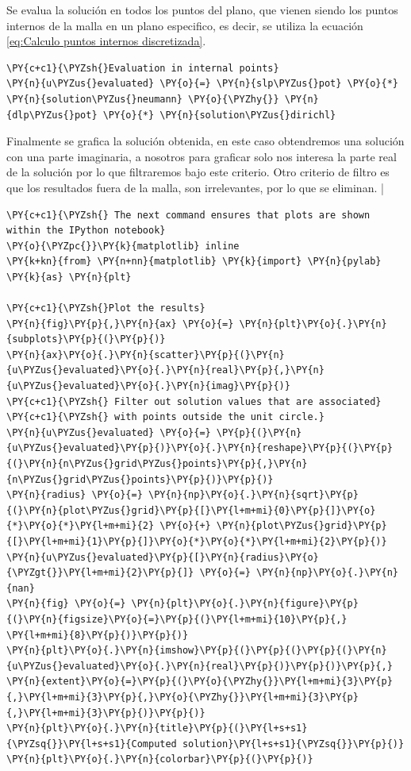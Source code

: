Se evalua la solución en todos los puntos del plano, que vienen siendo los puntos internos de la malla en un plano especifico, es decir, se utiliza la ecuación \eqref{eq:Calculo puntos internos discretizada}.
\begin{tcolorbox}
\begin{Verbatim}[commandchars=\\\{\}]
\PY{c+c1}{\PYZsh{}Evaluation in internal points} 
\PY{n}{u\PYZus{}evaluated} \PY{o}{=} \PY{n}{slp\PYZus{}pot} \PY{o}{*} \PY{n}{solution\PYZus{}neumann} \PY{o}{\PYZhy{}} \PY{n}{dlp\PYZus{}pot} \PY{o}{*} \PY{n}{solution\PYZus{}dirichl}
\end{Verbatim}
\end{tcolorbox}
Finalmente se grafica la solución obtenida, en este caso obtendremos una solución con una parte imaginaria, a nosotros para graficar solo nos interesa la parte real de la solución por lo que filtraremos bajo este criterio. Otro criterio de filtro es que los resultados fuera de la malla, son irrelevantes, por lo que se eliminan. |
\begin{tcolorbox}
\begin{Verbatim}[commandchars=\\\{\}]
\PY{c+c1}{\PYZsh{} The next command ensures that plots are shown within the IPython notebook}
\PY{o}{\PYZpc{}}\PY{k}{matplotlib} inline                
\PY{k+kn}{from} \PY{n+nn}{matplotlib} \PY{k}{import} \PY{n}{pylab} \PY{k}{as} \PY{n}{plt}
         
\PY{c+c1}{\PYZsh{}Plot the results}       
\PY{n}{fig}\PY{p}{,}\PY{n}{ax} \PY{o}{=} \PY{n}{plt}\PY{o}{.}\PY{n}{subplots}\PY{p}{(}\PY{p}{)}
\PY{n}{ax}\PY{o}{.}\PY{n}{scatter}\PY{p}{(}\PY{n}{u\PYZus{}evaluated}\PY{o}{.}\PY{n}{real}\PY{p}{,}\PY{n}{u\PYZus{}evaluated}\PY{o}{.}\PY{n}{imag}\PY{p}{)}
\PY{c+c1}{\PYZsh{} Filter out solution values that are associated} 
\PY{c+c1}{\PYZsh{} with points outside the unit circle.}
\PY{n}{u\PYZus{}evaluated} \PY{o}{=} \PY{p}{(}\PY{n}{u\PYZus{}evaluated}\PY{p}{)}\PY{o}{.}\PY{n}{reshape}\PY{p}{(}\PY{p}{(}\PY{n}{n\PYZus{}grid\PYZus{}points}\PY{p}{,}\PY{n}{n\PYZus{}grid\PYZus{}points}\PY{p}{)}\PY{p}{)}
\PY{n}{radius} \PY{o}{=} \PY{n}{np}\PY{o}{.}\PY{n}{sqrt}\PY{p}{(}\PY{n}{plot\PYZus{}grid}\PY{p}{[}\PY{l+m+mi}{0}\PY{p}{]}\PY{o}{*}\PY{o}{*}\PY{l+m+mi}{2} \PY{o}{+} \PY{n}{plot\PYZus{}grid}\PY{p}{[}\PY{l+m+mi}{1}\PY{p}{]}\PY{o}{*}\PY{o}{*}\PY{l+m+mi}{2}\PY{p}{)}
\PY{n}{u\PYZus{}evaluated}\PY{p}{[}\PY{n}{radius}\PY{o}{\PYZgt{}}\PY{l+m+mi}{2}\PY{p}{]} \PY{o}{=} \PY{n}{np}\PY{o}{.}\PY{n}{nan}
\PY{n}{fig} \PY{o}{=} \PY{n}{plt}\PY{o}{.}\PY{n}{figure}\PY{p}{(}\PY{n}{figsize}\PY{o}{=}\PY{p}{(}\PY{l+m+mi}{10}\PY{p}{,} \PY{l+m+mi}{8}\PY{p}{)}\PY{p}{)}
\PY{n}{plt}\PY{o}{.}\PY{n}{imshow}\PY{p}{(}\PY{p}{(}\PY{p}{(}\PY{n}{u\PYZus{}evaluated}\PY{o}{.}\PY{n}{real}\PY{p}{)}\PY{p}{)}\PY{p}{,} \PY{n}{extent}\PY{o}{=}\PY{p}{(}\PY{o}{\PYZhy{}}\PY{l+m+mi}{3}\PY{p}{,}\PY{l+m+mi}{3}\PY{p}{,}\PY{o}{\PYZhy{}}\PY{l+m+mi}{3}\PY{p}{,}\PY{l+m+mi}{3}\PY{p}{)}\PY{p}{)}
\PY{n}{plt}\PY{o}{.}\PY{n}{title}\PY{p}{(}\PY{l+s+s1}{\PYZsq{}}\PY{l+s+s1}{Computed solution}\PY{l+s+s1}{\PYZsq{}}\PY{p}{)}
\PY{n}{plt}\PY{o}{.}\PY{n}{colorbar}\PY{p}{(}\PY{p}{)}
\end{Verbatim}
\end{tcolorbox}
